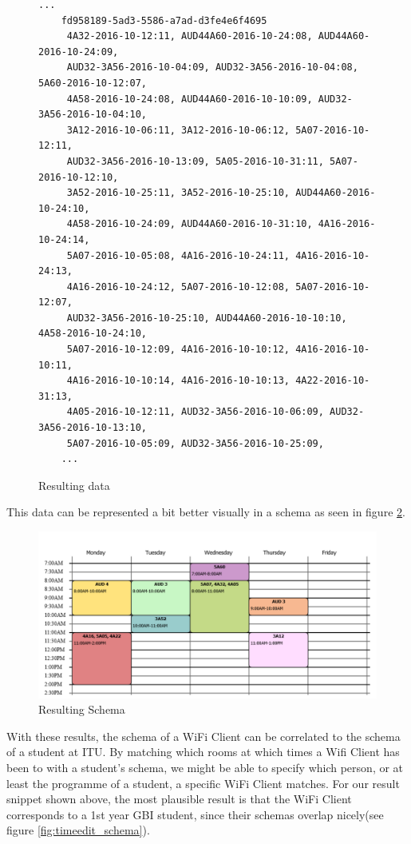 	\begin{figure}[H]
		\begin{lstlisting}[frame=single, backgroundcolor=\color{light-gray}, basicstyle=\footnotesize\ttfamily]
	...
	fd958189-5ad3-5586-a7ad-d3fe4e6f4695	
	 4A32-2016-10-12:11, AUD44A60-2016-10-24:08, AUD44A60-2016-10-24:09, 
	 AUD32-3A56-2016-10-04:09, AUD32-3A56-2016-10-04:08, 5A60-2016-10-12:07, 
	 4A58-2016-10-24:08, AUD44A60-2016-10-10:09, AUD32-3A56-2016-10-04:10, 
	 3A12-2016-10-06:11, 3A12-2016-10-06:12, 5A07-2016-10-12:11, 
	 AUD32-3A56-2016-10-13:09, 5A05-2016-10-31:11, 5A07-2016-10-12:10,
	 3A52-2016-10-25:11, 3A52-2016-10-25:10, AUD44A60-2016-10-24:10,
	 4A58-2016-10-24:09, AUD44A60-2016-10-31:10, 4A16-2016-10-24:14,
	 5A07-2016-10-05:08, 4A16-2016-10-24:11, 4A16-2016-10-24:13,
	 4A16-2016-10-24:12, 5A07-2016-10-12:08, 5A07-2016-10-12:07,
	 AUD32-3A56-2016-10-25:10, AUD44A60-2016-10-10:10, 4A58-2016-10-24:10,
	 5A07-2016-10-12:09, 4A16-2016-10-10:12, 4A16-2016-10-10:11,
	 4A16-2016-10-10:14, 4A16-2016-10-10:13, 4A22-2016-10-31:13,
	 4A05-2016-10-12:11, AUD32-3A56-2016-10-06:09, AUD32-3A56-2016-10-13:10,
	 5A07-2016-10-05:09, AUD32-3A56-2016-10-25:09,
	...
		\end{lstlisting}
		\caption{Resulting data}
		\label{fig:result_data}
	\end{figure}
	
	\newpar This data can be represented a bit better visually in a schema as seen in figure \ref{fig:result_schema}.
	
	\begin{figure}[H]
		\centering
		\includegraphics[width=\linewidth]{figures/schema-from-data.png}
		\caption{Resulting Schema}
		\label{fig:result_schema}
	\end{figure}
	
	\newpar With these results, the schema of a WiFi Client can be correlated to the schema of a student at ITU. By matching which rooms at which times a Wifi Client has been to with a student's schema, we might be able to specify which person, or at least the programme of a student, a specific WiFi Client matches. For our result snippet shown above, the most plausible result is that the WiFi Client corresponds to a 1st year GBI student, since their schemas overlap nicely(see figure \ref{fig:timeedit_schema}).
	
